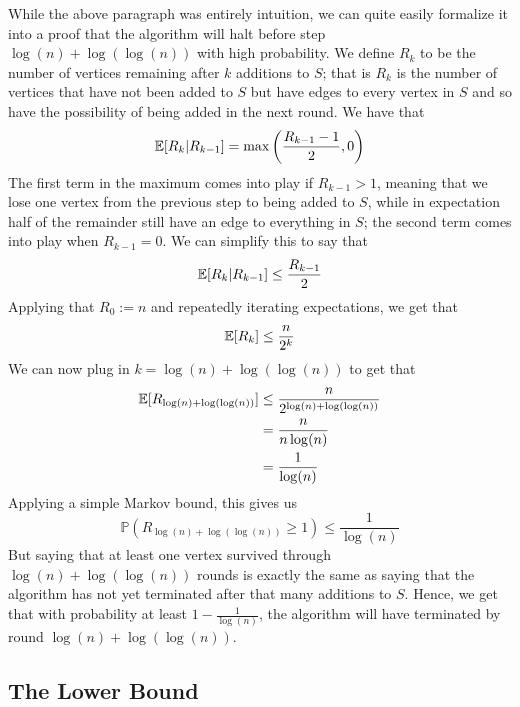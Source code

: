 \documentclass{article}
\begin{document}
While the above paragraph was entirely intuition, we can quite easily formalize it into a proof that the algorithm will halt before step $\log(n) + \log(\log(n))$ with high probability.  We define $R_k$ to be the number of vertices remaining after $k$ additions to $S$; that is $R_k$ is the number of vertices that have not been added to $S$ but have edges to every vertex in $S$ and so have the possibility of being added in the next round.  We have that
$$ \mathbb{E} [R_k | R_{k - 1}] = \max \left( \frac{R_{k - 1} - 1}{2}, 0 \right) $$
The first term in the maximum comes into play if $R_{k - 1} > 1$, meaning that we lose one vertex from the previous step to being added to $S$, while in expectation half of the remainder still have an edge to everything in $S$; the second term comes into play when $R_{k - 1} = 0$.  We can simplify this to say that
$$ \mathbb{E} [R_k | R_{k - 1}] \leq \frac{R_{k - 1}}{2} $$
Applying that $R_0 := n$ and repeatedly iterating expectations, we get that
$$\mathbb{E} [R_k] \leq \frac{n}{2^k}$$
We can now plug in $k = \log(n) + \log(\log(n))$ to get that
\begin{align*}
\mathbb{E} [R_{\log(n) + \log(\log(n))}] &\leq \frac{n}{2^{\log(n) + \log(\log(n))}} \\
&= \frac{n}{n\log(n)} \\
&= \frac{1}{\log(n)}
\end{align*}
Applying a simple Markov bound, this gives us
$$\mathbb{P}(R_{\log(n) + \log(\log(n))} \geq 1) \leq \frac{1}{\log(n)}$$
But saying that at least one vertex survived through $\log(n) + \log(\log(n))$ rounds is exactly the same as saying that the algorithm has not yet terminated after that many additions to $S$.  Hence, we get that with probability at least $1 - \frac{1}{\log(n)}$, the algorithm will have terminated by round $\log(n) + \log(\log(n))$.

\subsection{The Lower Bound}
\end{document}
